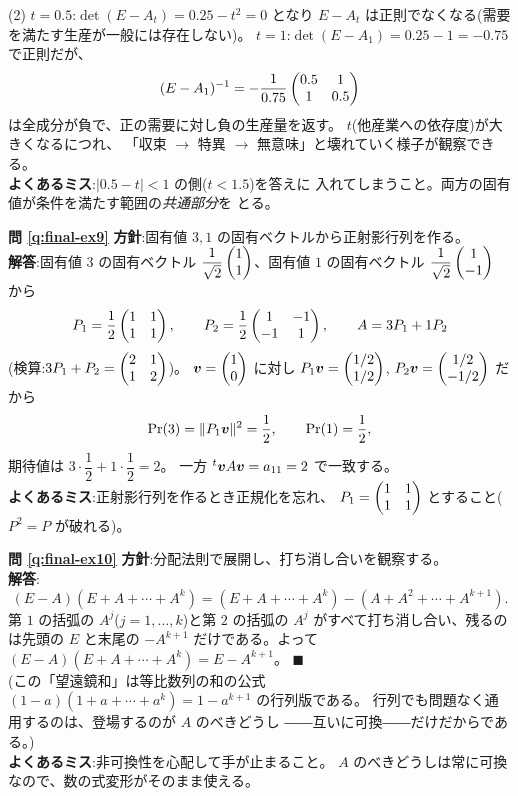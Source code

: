 (2) $t = 0.5$:$\det(E - A_t) = 0.25 - t^2 = 0$ となり
$E - A_t$ は正則でなくなる(需要を満たす生産が一般には存在しない)。
$t = 1$:$\det(E - A_1) = 0.25 - 1 = -0.75$ で正則だが、
\[
(E - A_1)^{-1} = -\frac{1}{0.75}\begin{pmatrix}0.5 & 1 \\ 1 & 0.5\end{pmatrix}
\]
は全成分が負で、正の需要に対し負の生産量を返す。
$t$(他産業への依存度)が大きくなるにつれ、
「収束 $\to$ 特異 $\to$ 無意味」と壊れていく様子が観察できる。\\
\textbf{よくあるミス}:$|0.5 - t| < 1$ の側($t < 1.5$)を答えに
入れてしまうこと。両方の固有値が条件を満たす範囲の\emph{共通部分}を
とる。

\bigskip
\noindent\textbf{問 \ref{q:final-ex9}}\quad
\textbf{方針}:固有値 $3, 1$ の固有ベクトルから正射影行列を作る。\\
\textbf{解答}:固有値 $3$ の固有ベクトル
$\dfrac{1}{\sqrt{2}}\begin{pmatrix}1 \\ 1\end{pmatrix}$、固有値 $1$ の固有ベクトル
$\dfrac{1}{\sqrt{2}}\begin{pmatrix}1 \\ -1\end{pmatrix}$ から
\[
P_1 = \frac{1}{2}\begin{pmatrix}1 & 1 \\ 1 & 1\end{pmatrix}, \qquad
P_2 = \frac{1}{2}\begin{pmatrix}1 & -1 \\ -1 & 1\end{pmatrix}, \qquad
A = 3P_1 + 1P_2
\]
(検算:$3P_1 + P_2 = \begin{pmatrix}2 & 1 \\ 1 & 2\end{pmatrix}$)。
$\bm{v} = \begin{pmatrix}1 \\ 0\end{pmatrix}$ に対し
$P_1\bm{v} = \begin{pmatrix}1/2 \\ 1/2\end{pmatrix}$, $P_2\bm{v} = \begin{pmatrix}1/2 \\ -1/2\end{pmatrix}$
だから
\[
\Pr(3) = \|P_1\bm{v}\|^2 = \frac{1}{2}, \qquad
\Pr(1) = \frac{1}{2},
\]
期待値は $3 \cdot \dfrac{1}{2} + 1 \cdot \dfrac{1}{2} = 2$。
一方 ${}^t\bm{v}A\bm{v} = a_{11} = 2$ で一致する。\\
\textbf{よくあるミス}:正射影行列を作るとき正規化を忘れ、
$P_1 = \begin{pmatrix}1 & 1 \\ 1 & 1\end{pmatrix}$ とすること($P^2 = P$ が破れる)。

\bigskip
\noindent\textbf{問 \ref{q:final-ex10}}\quad
\textbf{方針}:分配法則で展開し、打ち消し合いを観察する。\\
\textbf{解答}:
\[
(E - A)(E + A + \cdots + A^k)
= (E + A + \cdots + A^k) - (A + A^2 + \cdots + A^{k+1}).
\]
第 $1$ の括弧の $A^j$($j = 1, \dots, k$)と第 $2$ の括弧の
$A^j$ がすべて打ち消し合い、残るのは先頭の $E$ と末尾の
$-A^{k+1}$ だけである。よって
$(E - A)(E + A + \cdots + A^k) = E - A^{k+1}$。 $\blacksquare$\\
(この「望遠鏡和」は等比数列の和の公式
$(1 - a)(1 + a + \cdots + a^k) = 1 - a^{k+1}$ の行列版である。
行列でも問題なく通用するのは、登場するのが $A$ のべきどうし
――互いに可換――だけだからである。)\\
\textbf{よくあるミス}:非可換性を心配して手が止まること。
$A$ のべきどうしは常に可換なので、数の式変形がそのまま使える。

